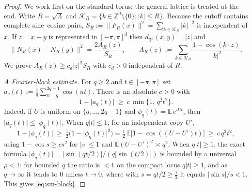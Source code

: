 \documentclass[review,supplement]{siamart220329}
\begin{document}
\begin{proof}
We work first on the standard torus; the general lattice is treated at the end.
Write $R=\sqrt\Lambda$ and $\mathcal K_R=\{k\in\mathbb Z^d\setminus\{0\}:\lvert k\rvert\le R\}$.
Because the cutoff contains complete sine--cosine pairs,
$S_R:=\lVert F_R(x)\rVert^2=\sum_{k\in\mathcal K_R}\lvert k\rvert^{-2}$ is
independent of $x$. If $z=x-y$ is represented in $[-\pi,\pi]^d$ then
$d_{\mathbb T^d}(x,y)=\lvert z\rvert$ and
\begin{equation}
\lVert N_R(x)-N_R(y)\rVert^2=\frac{2A_R(z)}{S_R},\qquad
A_R(z):=\sum_{k\in\mathcal K_R}\frac{1-\cos(k\cdot z)}{\lvert k\rvert^2}.
\label{eq:sm-N}
\end{equation}
We prove $A_R(z)\ge c_d\lvert z\rvert^2 S_R$ with $c_d>0$ independent of $R$.

\smallskip\noindent\emph{A Fourier-block estimate.} For $q\ge2$ and
$t\in[-\pi,\pi]$ set $a_q(t):=\tfrac1q\sum_{n=q}^{2q-1}\cos(nt)$. There is an
absolute $c>0$ with
\begin{equation}
1-\lvert a_q(t)\rvert\ \ge\ c\,\min\{1,\,q^2t^2\}.
\label{eq:sm-block}
\end{equation}
Indeed, if $U$ is uniform on $\{q,\dots,2q-1\}$ and $\phi_q(t)=\mathbb E\,e^{iUt}$,
then $\lvert a_q(t)\rvert\le\lvert\phi_q(t)\rvert$. When $q\lvert t\rvert\le1$, for an
independent copy $U'$,
\[
1-\lvert\phi_q(t)\rvert\ \ge\ \tfrac12\big(1-\lvert\phi_q(t)\rvert^2\big)
=\tfrac12\,\mathbb E\big[1-\cos((U-U')t)\big]\ \ge\ c\,q^2t^2,
\]
using $1-\cos s\ge cs^2$ for $\lvert s\rvert\le1$ and $\mathbb E(U-U')^2\asymp q^2$.
When $q\lvert t\rvert\ge1$, the exact formula
$\lvert\phi_q(t)\rvert=\lvert\sin(qt/2)\rvert/(q\lvert\sin(t/2)\rvert)$ is bounded by
a universal $\rho<1$: for bounded $q$ the ratio is $<1$ on the compact locus
$q\lvert t\rvert\ge1$, and as $q\to\infty$ it tends to $0$ unless $t\to0$, where with
$s=qt/2\ge\tfrac12$ it equals $\lvert\sin s\rvert/s<1$. This gives \eqref{eq:sm-block}.


\end{proof}
\end{document}
